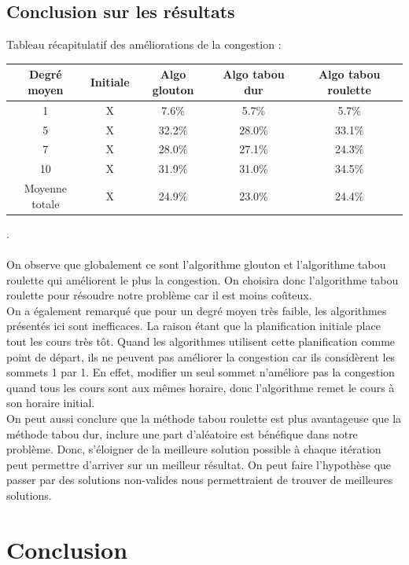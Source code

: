 \documentclass[a4paper,11pt]{article}
\begin{document}
	\subsection{Conclusion sur les résultats}
	Tableau récapitulatif des améliorations de la congestion :\\
	\begin{tabular}{|c|c|c|c|c|}
  		\hline
  		Degré moyen & Initiale & Algo glouton & Algo tabou dur & Algo tabou roulette\\
  		\hline
  		1 & X & 7.6\% & 5.7\% & 5.7\%\\
  		\hline 
  		5 & X & 32.2\% & 28.0\% & 33.1\%\\
  		\hline 
  		7 & X & 28.0\% & 27.1\% & 24.3\%\\
  		\hline 
  		10 & X & 31.9\% & 31.0\% & 34.5\%\\
  		\hline 
  		Moyenne totale & X & 24.9\% & 23.0\% & 24.4\%\\
  	\end{tabular}
	.\\
	\\
	On observe que globalement ce sont l'algorithme glouton et l'algorithme tabou roulette qui améliorent le plus la congestion. On choisira donc l'algorithme tabou roulette pour résoudre notre problème car il est moins coûteux.\\
	On a également remarqué que pour un degré moyen très faible, les algorithmes présentés ici sont inefficaces. La raison étant que la planification initiale place tout les cours très tôt. Quand les algorithmes utilisent cette planification comme point de départ, ils ne peuvent pas améliorer la congestion car ils considèrent les sommets 1 par 1. En effet, modifier un seul sommet n'améliore pas la congestion quand tous les cours sont aux mêmes horaire, donc l'algorithme remet le cours à son horaire initial.\\
	On peut aussi conclure que la méthode tabou roulette est plus avantageuse que la méthode tabou dur, inclure une part d'aléatoire est bénéfique dans notre problème. 
	Donc, s'éloigner de la meilleure solution possible à chaque itération peut permettre d'arriver sur un meilleur résultat. On peut faire l'hypothèse que passer par des solutions non-valides nous permettraient de trouver de meilleures solutions.\\

\section{Conclusion}
\end{document}
